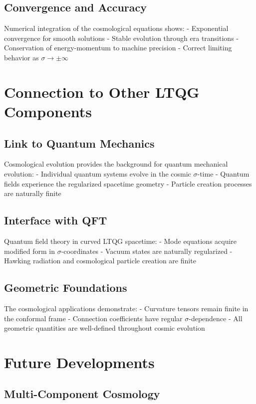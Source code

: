 \documentclass[11pt,a4paper]{article}
\begin{document}
\subsection{Convergence and Accuracy}

Numerical integration of the cosmological equations shows:
- Exponential convergence for smooth solutions
- Stable evolution through era transitions
- Conservation of energy-momentum to machine precision
- Correct limiting behavior as $\sigma \to \pm\infty$

\section{Connection to Other LTQG Components}

\subsection{Link to Quantum Mechanics}

Cosmological evolution provides the background for quantum mechanical evolution:
- Individual quantum systems evolve in the cosmic $\sigma$-time
- Quantum fields experience the regularized spacetime geometry
- Particle creation processes are naturally finite

\subsection{Interface with QFT}

Quantum field theory in curved LTQG spacetime:
- Mode equations acquire modified form in $\sigma$-coordinates
- Vacuum states are naturally regularized
- Hawking radiation and cosmological particle creation are finite

\subsection{Geometric Foundations}

The cosmological applications demonstrate:
- Curvature tensors remain finite in the conformal frame
- Connection coefficients have regular $\sigma$-dependence
- All geometric quantities are well-defined throughout cosmic evolution

\section{Future Developments}

\subsection{Multi-Component Cosmology}
\end{document}
